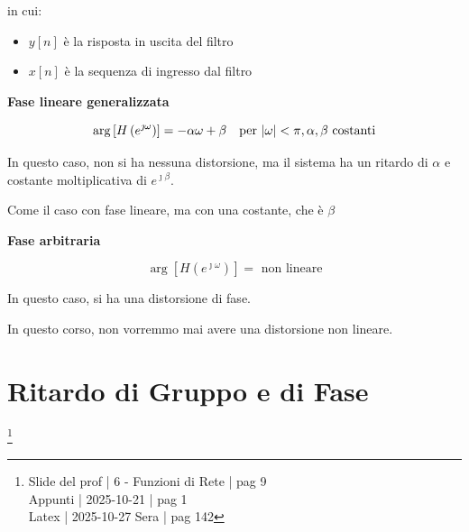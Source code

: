 in cui: 

\begin{itemize}
    \item $y \left[ n\right]$ è la risposta in uscita del filtro 
    \item $x \left[ n\right]$ è la sequenza di ingresso dal filtro 
\end{itemize}

\textbf{Fase lineare generalizzata} \newline 

{
    \Large 
    \begin{equation}
        \arg \left[ H \left( e^{\jmath \omega}\right)\right] 
        = 
        - \alpha \omega + \beta
        \quad 
        \text{per }
        \abs{\omega} < \pi, \alpha, \beta \text{ costanti}
    \end{equation}
}

In questo caso, non si ha nessuna distorsione,
ma il sistema ha un ritardo di $\alpha$ e costante moltiplicativa di $e^{\jmath \beta}$. \newline

\begin{tcolorbox}
    Come il caso con fase lineare, ma con una costante, che è $\beta$
\end{tcolorbox} 

\newpage 

\textbf{Fase arbitraria} \newline 

{
    \Large 
    \begin{equation}
        \arg \left[ H \left( e^{\jmath \omega}\right)\right] 
        = 
        \text{ non lineare}
    \end{equation}
}

In questo caso, si ha una distorsione di fase. \newline 

\begin{tcolorbox}
    In questo corso, non vorremmo mai avere una distorsione non lineare.  
\end{tcolorbox}

\newpage 

\section{Ritardo di Gruppo e di Fase}

\footnote{ 
    Slide del prof | 6 - Funzioni di Rete | pag 9\\
    Appunti | 2025-10-21 | pag 1  \\ 
    Latex | 2025-10-27 Sera | pag 142 
}

